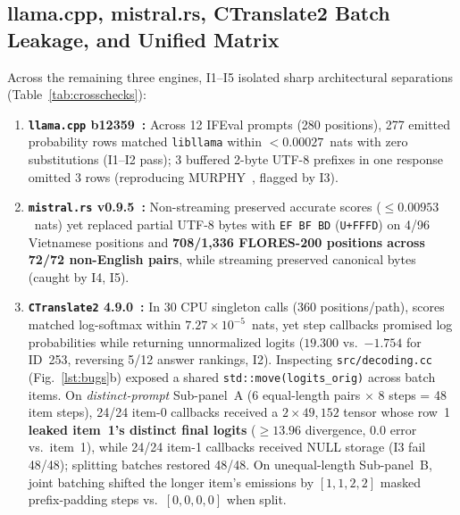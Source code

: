 \documentclass[11pt,letterpaper]{article}
\begin{document}
\subsection{llama.cpp, mistral.rs, CTranslate2 Batch Leakage, and Unified Matrix}
Across the remaining three engines, \textsc{I1}--\textsc{I5} isolated sharp architectural separations (Table~\ref{tab:crosschecks}):
\begin{enumerate}
\item \textbf{\texttt{llama.cpp} b12359~\cite{llama}:} Across 12 IFEval prompts (280 positions), 277 emitted probability rows matched \texttt{libllama} within $<0.00027$~nats with zero substitutions (\textsc{I1}--\textsc{I2} pass); 3 buffered 2-byte UTF-8 prefixes in one response omitted 3 rows (reproducing MURPHY~\cite{murphy}, flagged by \textsc{I3}).
\item \textbf{\texttt{mistral.rs} v0.9.5~\cite{mistralrs}:} Non-streaming preserved accurate scores ($\le 0.00953$~nats) yet replaced partial UTF-8 bytes with \texttt{EF BF BD} (\texttt{U+FFFD}) on 4/96 Vietnamese positions and \textbf{708/1,336 FLORES-200 positions across 72/72 non-English pairs}, while streaming preserved canonical bytes (caught by \textsc{I4}, \textsc{I5}).
\item \textbf{\texttt{CTranslate2} 4.9.0~\cite{ct2heldout}:} In 30 CPU singleton calls (360 positions/path), scores matched log-softmax within $7.27\times 10^{-5}$~nats, yet step callbacks promised log probabilities while returning unnormalized logits ($19.300$ vs.\ $-1.754$ for ID~253, reversing 5/12 answer rankings, \textsc{I2}). Inspecting \texttt{src/decoding.cc} (Fig.~\ref{lst:bugs}b) exposed a shared \texttt{std::move(logits\_orig)} across batch items. On \emph{distinct-prompt} Sub-panel~A (6 equal-length pairs $\times$ 8 steps = 48 item steps), 24/24 item-0 callbacks received a $2\times 49{,}152$ tensor whose row~1 \textbf{leaked item~1's distinct final logits} ($\ge 13.96$ divergence, 0.0 error vs.\ item~1), while 24/24 item-1 callbacks received NULL storage (\textsc{I3} fail 48/48); splitting batches restored 48/48. On unequal-length Sub-panel~B, joint batching shifted the longer item's emissions by $[1,1,2,2]$ masked prefix-padding steps vs.\ $[0,0,0,0]$ when split.
\end{enumerate}
\end{document}
